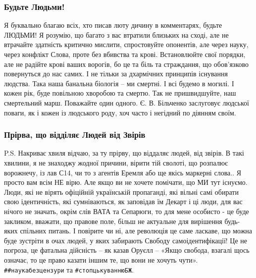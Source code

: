 \subsubsection{Будьте Людьми!}

Я буквально благаю всіх, хто писав люту дичину в комментарях, будьте ЛЮДЬМИ! Я
розумію, що багато з вас втратили близьких на сході, але не втрачайте здатність
критично мислити, спростовуйте опонентів, але через науку, через конфлікт
Слова, проте без вбивства та крові. Встановлюйте свої порядки, але не радійте
крові ваших ворогів, бо це та біль та страждання, що обов'язково повернуться до
нас самих. І не тільки за дхармічних принципів існування людства. Така наша
банальна біологія – ми смертні. І всі будемо в могилі.  І кожен рік, буде
повільною хворобою та смертю. Так не пришвидшуйте, наш смертельний марш.
Поважайте один одного. Є. В. Більченко заслуговує людської поваги, як і кожен із
людського роду, хоч часто і негідний по діянням своїм. 

\subsubsection{Прірва, що відділяє Людей від Звірів}

P.S. Накриває хвиля відчаю, за ту прірву, що віддаляє людей, від звірів. В такі
хвилини, я не знаходжу жодної причини, вірити тій сволоті, що розпалює
ворожнечу, із лав С14, чи то з агентів Еремля або ще якісь маркерні слова.. Я
просто вам всім НЕ вірю. Але якщо ви не хочете помічати, що МИ тут існуємо.
Люди, які не вірять офіційній українській пропаганді, які вільні самі обирати
свою ідентичність, які сумніваються, як заповідав їм Декарт і ці люди, для вас
нічого не значать, окрім слів ВАТА та Сепарюги, то для мене особисто - це буде
закликом, вважати, що правове поле, більш не актуальне для вирішення будь-яких
спільних питань. І повірите чи ні, але революція це саме ласкаве, що можна буде
зустріти в очах людей, у яких забирають Свободу самоідентифікації! Це не
погроза, це фатальна дійсність – як казав Оруєлл – «Якщо свобода, взагалі щось
означає, то це право казати іншим те, що вони не хочуть чути».
\verb|##наукабезцензури| та \verb|#стопцькуваннюБЖ|.



